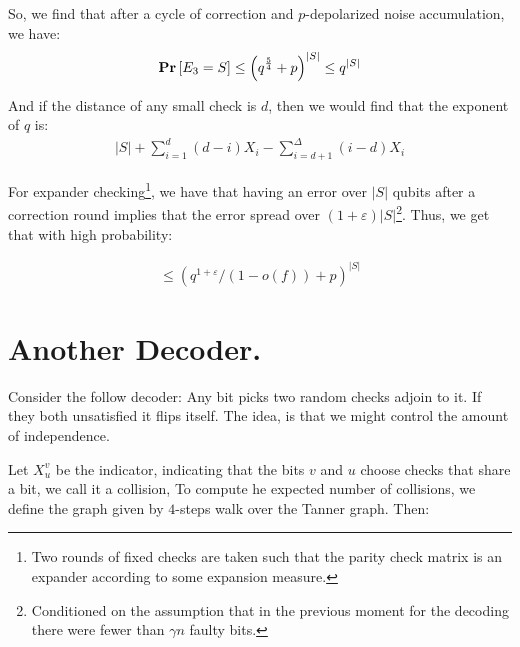 \documentclass[manuscript,screen,review]{acmart}
\begin{document}
So, we find that after a cycle of correction and $p$-depolarized noise accumulation, we have:
\begin{equation*}
  \begin{split}
    \mathbf{Pr} \left[ E_{3} = S \right] \le \left( q^{\frac{5}{4}} + p \right)^{|S|} \le q^{|S|}
  \end{split}
\end{equation*}

And if the distance of any small check is $d$, then we would find that the exponent of $q$ is:
\begin{equation*}
  \begin{split}
    |S| + \sum^{d}_{i=1}\left( d-i \right)X_i - \sum_{i=d+1}^{\Delta} \left( i - d \right)X_{i}
  \end{split}
\end{equation*}

For expander checking\footnote{Two rounds of fixed checks are taken such that the parity check matrix is an expander according to some expansion measure.}, we have that having an error over $|S|$ qubits after a correction round implies that the error spread over $\left( 1 + \varepsilon \right)|S|$\footnote{Conditioned on the assumption that in the previous moment for the decoding there were fewer than $\gamma n$ faulty bits.}. Thus, we get that with high probability:

\begin{equation*}
  \begin{split}
    \le \left( q^{1+\varepsilon} / \left( 1 - o(f) \right)   + p \right)^{|S|}
  \end{split}
\end{equation*}


\section{Another Decoder.}

Consider the follow decoder: Any bit picks two random checks adjoin to it. If they both unsatisfied it flips itself. The idea, is that we might control the amount of independence. 

\newcommand*{\Xuv}{X_{u}^{v}}

Let $X_{u}^{v}$ be the indicator, indicating that the bits $v$ and $u$ choose checks that share a bit, we call it a collision, To compute he expected number of collisions, we define the graph given by $4$-steps walk over the Tanner graph. Then:  
\end{document}
